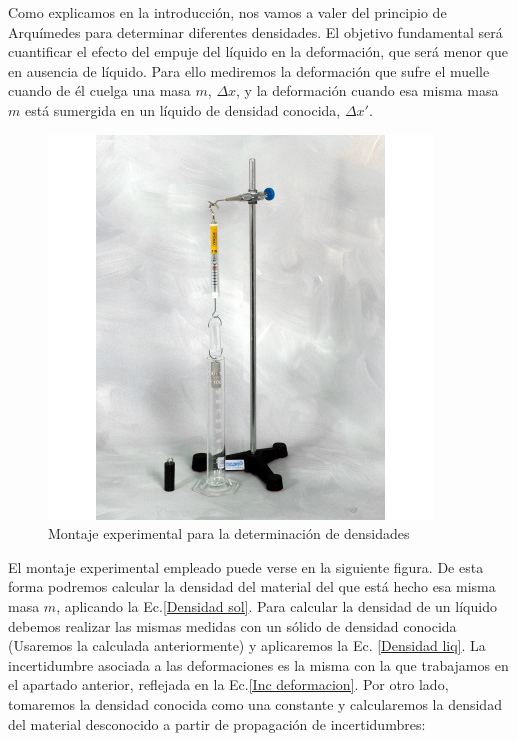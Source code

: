 \documentclass[a4paper,12pt,titlepage]{report}
\begin{document}
Como explicamos en la introducción, nos vamos a valer del principio de Arquímedes para determinar diferentes densidades. El objetivo fundamental será cuantificar el efecto del empuje del líquido en la deformación, que será menor que en ausencia de líquido. Para ello mediremos la deformación que sufre el muelle cuando de él cuelga una masa $m$, $\Delta x$, y la deformación cuando esa misma masa $m$ está sumergida en un líquido de densidad conocida, $\Delta x'$. 

\newpage

\begin{figure}
    \centering
    \includegraphics[width=0.95\linewidth]{Images/hooke+arquimedes.jpg}
    \caption{Montaje experimental para la determinación de densidades}
    \label{Hooke+arquimedes}
\end{figure}

El montaje experimental empleado puede verse en la siguiente figura. De esta forma podremos calcular la densidad del material del que está hecho esa misma masa $m$, aplicando la Ec.\ref{Densidad sol}. Para calcular la densidad de un líquido debemos realizar las mismas medidas con un sólido de densidad conocida (Usaremos la calculada anteriormente) y aplicaremos la Ec. \ref{Densidad liq}. La incertidumbre asociada a las deformaciones es la misma con la que trabajamos en el apartado anterior, reflejada en la Ec.\ref{Inc deformacion}. Por otro lado, tomaremos la densidad conocida como una constante y calcularemos la densidad del material desconocido a partir de propagación de incertidumbres:
\end{document}
